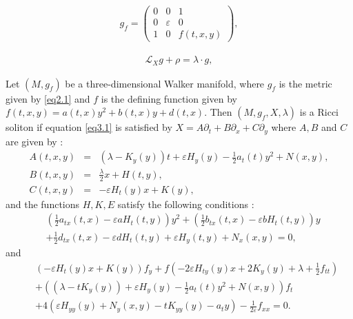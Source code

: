 \documentclass[10pt,a4paper]{amsart}
\begin{document}
\begin{eqnarray}\label{eq2.1} 
g _f= \left( \begin{array}{cccc}
0&0&1\\
0&\varepsilon&0\\
1&0&f(t,x,y)
\end{array}
\right),
\end{eqnarray}

\begin{eqnarray}\label{eq3.1} 
\mathcal{L}_X g + \rho = \lambda \cdot g,
\end{eqnarray}

\begin{theorem}
Let $(M, g_f)$ be a three-dimensional Walker manifold, where $g_f$ is the metric 
given by \eqref{eq2.1} and $f$ is the defining function given by 
$f(t,x,y) = a(t,x) y^{2} + b(t,x) y + d(t,x)$.  Then $(M, g_f, X, \lambda)$ is a Ricci soliton 
if equation \eqref{eq3.1} is satisfied by $X = A\partial_t+ B\partial_x + C \partial_y $ 
where $A, B $ and $C$ are given by :
\begin{eqnarray}\label{eq3.3}
A(t,x, y) &=& \left( \lambda-K_y(y)\right)t + \varepsilon H_{y}(y)
- \frac{1}{2}a_{t}(t)y^2 +N(x,y), \nonumber\\ 
B(t,x,y) &=&\frac{\lambda}{2}x + H(t,y),\nonumber\\
C(t,x,y)&=& -\varepsilon H_{t}(y)x+K(y),
\end{eqnarray}
and the functions $H, K, E$ satisfy the following conditions :
\begin{align*}
&\left( \frac{1}{2}a_{tx}(t,x)	-\varepsilon aH_{t}(t,y)\right) y^{2}
+ \left(  \frac{1}{2}b_{tx}(t,x)-\varepsilon bH_{t}(t,y)\right) y\nonumber\\
& + \frac{1}{2}d_{tx}(t,x)-\varepsilon dH_{t}(t,y)+\varepsilon H_{y}(t,y) + N_{x}(x,y) = 0,
\end{align*} 
and
\begin{align*}
&&\left(-\varepsilon H_{t}(y)x + K(y)\right) f_y + f\left( -2\varepsilon H_{ty}(y)x
+ 2K_y(y) + \lambda + \frac{1}{2}f_{tt}\right)\nonumber  \\
&& + \left( ( \lambda - tK_y(y)) + \varepsilon H_{y}(y) - \frac{1}{2}a_{t}(t)y^2 
+ N(x,y)\right) f_t\nonumber\\
&& + 4\left(\varepsilon H_{yy}(y) + N_y(x,y) - tK_{yy}(y) - a_ty \right) 
- \frac{1}{2\varepsilon}f_{xx}=0.
\end{align*}
\end{theorem}
\end{document}
